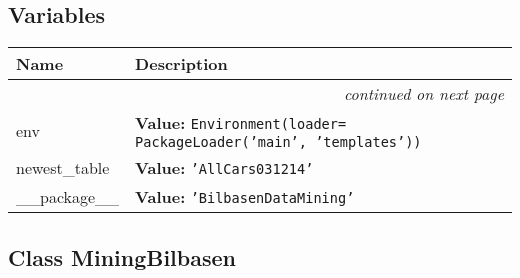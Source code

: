 
  \subsection{Variables}

    \vspace{-1cm}
\hspace{\varindent}\begin{longtable}{|p{\varnamewidth}|p{\vardescrwidth}|l}
\cline{1-2}
\cline{1-2} \centering \textbf{Name} & \centering \textbf{Description}& \\
\cline{1-2}
\endhead\cline{1-2}\multicolumn{3}{r}{\small\textit{continued on next page}}\\\endfoot\cline{1-2}
\endlastfoot\raggedright e\-n\-v\- & \raggedright \textbf{Value:} 
{\tt Environment(loader= PackageLoader('main', 'templates'))}&\\
\cline{1-2}
\raggedright n\-e\-w\-e\-s\-t\-\_\-t\-a\-b\-l\-e\- & \raggedright \textbf{Value:} 
{\tt \texttt{'}\texttt{AllCars031214}\texttt{'}}&\\
\cline{1-2}
\raggedright \_\-\_\-p\-a\-c\-k\-a\-g\-e\-\_\-\_\- & \raggedright \textbf{Value:} 
{\tt \texttt{'}\texttt{BilbasenDataMining}\texttt{'}}&\\
\cline{1-2}
\end{longtable}



\subsection{Class MiningBilbasen}

    \label{BilbasenDataMining:main:MiningBilbasen}


